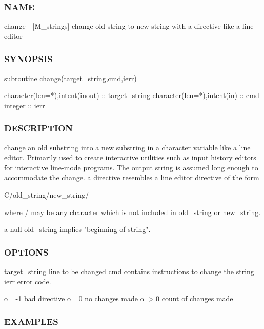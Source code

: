 \subsubsection*{N\+A\+ME}

change -\/ \mbox{[}M\+\_\+strings\mbox{]} change old string to new string with a directive like a line editor 

\subsubsection*{S\+Y\+N\+O\+P\+S\+IS}

\begin{DoxyVerb}subroutine change(target_string,cmd,ierr)

 character(len=*),intent(inout) :: target_string
 character(len=*),intent(in)    :: cmd
 integer                        :: ierr
\end{DoxyVerb}


\subsubsection*{D\+E\+S\+C\+R\+I\+P\+T\+I\+ON}

\begin{DoxyVerb}change an old substring into a new substring in a character variable
like a line editor. Primarily used to create interactive utilities
such as input history editors for interactive line-mode programs. The
output string is assumed long enough to accommodate the change.
a directive resembles a line editor directive of the form

   C/old_string/new_string/

where / may be any character which is not included in old_string
or new_string.

a null old_string implies "beginning of string".
\end{DoxyVerb}


\subsubsection*{O\+P\+T\+I\+O\+NS}

target\+\_\+string line to be changed cmd contains instructions to change the string ierr error code.

o =-\/1 bad directive o =0 no changes made o $>$0 count of changes made

\subsubsection*{E\+X\+A\+M\+P\+L\+ES}

